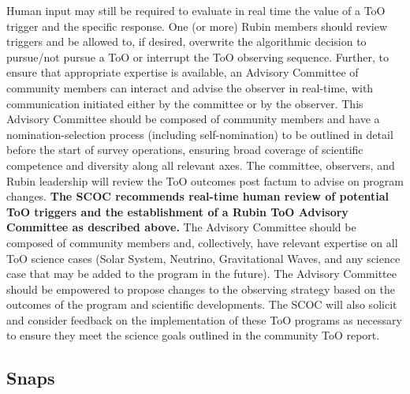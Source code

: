 Human input may still be required to evaluate in real time the value of a ToO trigger and the specific response.  One (or more) Rubin members %
should review triggers and be allowed to, if desired, overwrite the algorithmic decision to pursue/not pursue a ToO or interrupt the ToO observing sequence. Further, to ensure that appropriate expertise is available, an Advisory Committee of community members can interact and advise the observer in real-time, with communication initiated either by the committee or by the observer. 
This Advisory Committee should be composed of community members and have a nomination-selection process (including self-nomination) to be outlined in detail before the start of survey operations, ensuring broad coverage of scientific competence and diversity along all relevant axes.
The committee, observers, and Rubin leadership will review the ToO outcomes post factum to advise on program changes. 
{\bf The SCOC recommends real-time human review of potential ToO triggers and the establishment of a Rubin ToO Advisory Committee as described above.} The Advisory Committee should be composed of community members and, collectively, have relevant expertise on all ToO science cases (Solar System, Neutrino, Gravitational Waves, and any science case that may be added to the program in the future). The Advisory Committee should be empowered to propose changes to the observing strategy based on the outcomes of the program and scientific developments. The SCOC will also solicit and consider feedback on the implementation of these ToO programs as necessary to ensure they meet the science goals outlined in the community ToO report. 



\subsection{Snaps}\label{sec:snaps}

